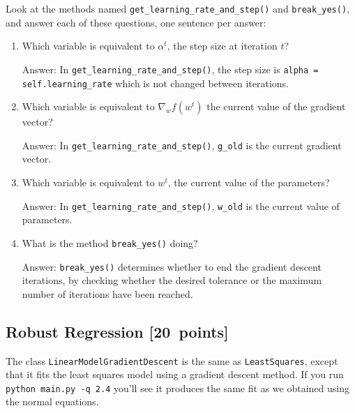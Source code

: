 \documentclass{article}
\newcommand{\blu}[1]{{\textcolor{blu}{#1}}}
\newenvironment{answer}{\par\begingroup\color{gre}Answer: }{\endgroup}
\let\ask\blu
\newcommand\pts[1]{\textcolor{pointscolour}{[#1~points]}}
\begin{document}
Look at the methods named \texttt{get\_learning\_rate\_and\_step()} and \texttt{break\_yes()}, and \ask{answer each of these questions, one sentence per answer:}
\begin{enumerate}
    \item Which variable is equivalent to $\alpha^t$, the step size at iteration $t$?
        \begin{answer}
            In \texttt{get\_learning\_rate\_and\_step()}, the step size is \texttt{alpha = self.learning\_rate} which is not changed between iterations.
        \end{answer}
    \item Which variable is equivalent to $\nabla_w f(w^t)$ the current value of the gradient vector?
        \begin{answer}
            In \texttt{get\_learning\_rate\_and\_step()}, \texttt{g\_old} is the current gradient vector.
        \end{answer}
    \item Which variable is equivalent to $w^t$, the current value of the parameters?
        \begin{answer}
            In \texttt{get\_learning\_rate\_and\_step()}, \texttt{w\_old} is the current value of parameters.
        \end{answer}
    \item What is the method \texttt{break\_yes()} doing?
        \begin{answer}
            \texttt{break\_yes()} determines whether to end the gradient descent iterations, by checking whether the desired tolerance or the maximum number of iterations have been reached.
        \end{answer}
\end{enumerate}


\subsection{Robust Regression \pts{20}}

The class \texttt{LinearModelGradientDescent} is the same as \texttt{LeastSquares}, except that it fits the least squares model using a gradient descent method. If you run \verb|python main.py -q 2.4| you'll see it produces the same fit as we obtained using the normal equations.

\end{document}
